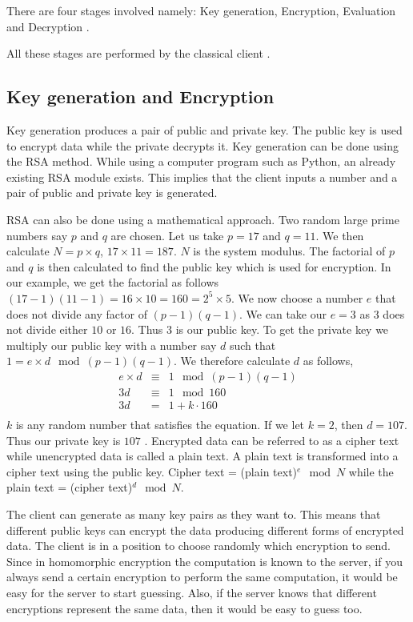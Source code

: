 There are four stages involved namely: Key generation, Encryption, Evaluation and Decryption \citep{broadbent2015quantum}.

All these stages are performed by the classical client . 

\subsection{Key generation and Encryption} 
Key generation produces a pair of public and private key. The public key is used to encrypt data while the private decrypts it. Key generation can be done using the RSA method. While using a computer program such as Python, an already existing RSA module exists. This implies that the client inputs a number and a pair of public and private key is generated. 

RSA can also be done using a mathematical approach. Two random large prime numbers say $p$ and $q$ are chosen. Let us take $p = 17$ and $q = 11$. We then calculate $N = p\times q$, $17\times 11 = 187$. $N$ is the system modulus.  The factorial of $p$ and $q$ is then calculated to find the public key which is used for encryption. In our example, we get the factorial as follows $(17-1)(11-1) = 16 \times 10 = 160 = 2^5 \times 5$. We now choose a number $e$ that does not divide any factor of $(p-1)(q-1)$. We can take our $e = 3$ as $3$ does not divide either $10$ or $16$. Thus $3$ is our public key. To get the private key we multiply our public key with a number say $d$ such that $ 1 = e \times d \mod (p-1)(q-1)$. We therefore calculate $d$ as follows, 
\begin{eqnarray*}
e \times d &\equiv & 1 \mod (p-1)(q-1)\\
3d &\equiv & 1 \mod 160\\
3d &=& 1 + k\cdot 160 \\
\end{eqnarray*}
$k$ is any random number that satisfies the equation. If we let $k =2$, then $d = 107$. Thus our private key is $107$ \citep{meissen2012mathematical}. Encrypted data can be referred to as a cipher text while unencrypted data is called a plain text. A plain text is transformed into a cipher text using the public key. Cipher text = (plain text)$^e \mod N$ while the plain text = (cipher text)$^d \mod N$.

The client can generate as many key pairs as they want to. This means that different public keys can encrypt the data producing different forms of encrypted data. The client is in a position to choose randomly which encryption to send. Since in homomorphic encryption the computation is known to the server, if you always send a certain encryption to perform the same computation, it would be easy for the server to start guessing. Also, if the server knows that different encryptions represent the same data, then it would be easy to guess too.

